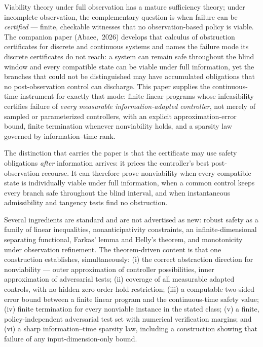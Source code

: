 \documentclass[10pt,twocolumn]{article}
\theoremstyle{definition}
\begin{document}
Viability theory under full observation has a mature sufficiency theory; under
incomplete observation, the complementary question is when failure can be
\emph{certified} --- finite, checkable witnesses that no observation-based
policy is viable. The companion paper
\mbox{(Abaee, 2026)} develops that calculus of obstruction certificates for
discrete and continuous systems and names the failure mode its discrete
certificates do not reach: a system can remain safe throughout the blind
window and every compatible state can be viable under full information, yet
the branches that could not be distinguished may have accumulated obligations
that no post-observation control can discharge. This paper supplies the
continuous-time instrument for exactly that mode: finite linear programs whose
infeasibility certifies failure of \emph{every measurable
information-adapted controller}, not merely of sampled or parameterized
controllers, with an explicit approximation-error bound, finite termination
whenever nonviability holds, and a sparsity law governed by
information--time rank.

The distinction that carries the paper is that the certificate may use safety
obligations \emph{after} information arrives: it prices the controller's best
post-observation recourse. It can therefore prove nonviability when every
compatible state is individually viable under full information, when a common
control keeps every branch safe throughout the blind interval, and when
instantaneous admissibility and tangency tests find no obstruction.

Several ingredients are standard and are not advertised as new: robust safety
as a family of linear inequalities, nonanticipativity constraints, an
infinite-dimensional separating functional, Farkas' lemma and Helly's theorem,
and monotonicity under observation refinement. The theorem-driven content is
that one construction establishes, simultaneously: (i) the correct abstraction
direction for nonviability --- outer approximation of controller
possibilities, inner approximation of adversarial tests; (ii) coverage of all
measurable adapted controls, with no hidden zero-order-hold restriction;
(iii) a computable two-sided error bound between a finite linear program and
the continuous-time safety value; (iv) finite termination for every nonviable
instance in the stated class; (v) a finite, policy-independent adversarial
test set with numerical verification margins; and (vi) a sharp
information--time sparsity law, including a construction showing that failure
of any input-dimension-only bound.
\end{document}
